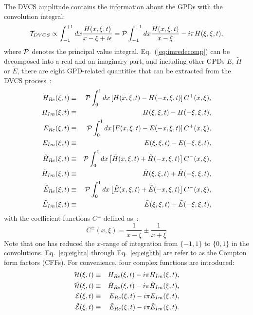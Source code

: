 The DVCS amplitude contains the information about the GPDs with the convolution integral:
\begin{eqnarray}
\mathcal{T}_{DVCS} \propto \int_{-1}^{+1}d x {{H(x,\xi,t)} \over {x - \xi + i \epsilon}}=
{\cal P} \int_{-1}^{+1}d x {H(x,\xi,t) \over {x - \xi}} -i\pi H(\xi,\xi,t) ,
\label{eq:imredecomp}
\end{eqnarray}
where ${\cal P}$ denotes the principal value integral. Eq.~(\ref{eq:imredecomp}) can be decomposed into a real and an imaginary part, and including other GPDs $E$, $\tilde{H}$ or $\tilde{E}$, there are eight GPD-related quantities that can be extracted from the DVCS process~\cite{Gui03}:
\begin{eqnarray}
H_{Re}(\xi , t) &\equiv& {\cal P} \int_0^1 d x \left[ H(x, \xi, t) - H(-x, \xi, t) \right] C^+(x, \xi),\label{eq:eighta} \\
H_{Im}(\xi , t) &\equiv& H(\xi , \xi, t) - H(- \xi, \xi, t),\label{eq:eightb} \\
E_{Re}(\xi , t) &\equiv&   {\cal P}  \int_0^1 d x \left[ E(x, \xi, t) - E(-x, \xi, t) \right] C^+(x, \xi),\label{eq:eightc} \\
E_{Im}(\xi , t) &\equiv& E(\xi , \xi, t) - E(- \xi, \xi, t), \label{eq:eightd} \\
\tilde H_{Re}(\xi , t) &\equiv&  {\cal P}  \int_0^1 d x \left[ \tilde H(x, \xi, t) + \tilde H(-x, \xi, t) \right] C^-(x,\xi),\label{eq:eighte} \\
\tilde H_{Im}(\xi , t) &\equiv& \tilde H(\xi , \xi, t) + \tilde H(- \xi, \xi, t),\label{eq:eightf} \\
\tilde E_{Re}(\xi , t) &\equiv&  {\cal P}  \int_0^1 d x \left[ \tilde E(x, \xi, t) + \tilde E(-x, \xi, t) \right] C^-(x,\xi),\label{eq:eightg} \\
\tilde E_{Im}(\xi , t) &\equiv& \tilde E(\xi , \xi, t) + \tilde E(- \xi, \xi, t), \label{eq:eighth} 
\end{eqnarray}
with the coefficient functions $C^\pm$ defined as~:
\begin{equation}
C^\pm(x, \xi) = \frac{1}{x - \xi} \pm \frac{1}{x + \xi}
\end{equation}
\noindent
Note that one has reduced the $x$-range of integration from $\{-1,1\}$ to $\{0,1\}$ in the convolutions. Eq.~\ref{eq:eighta} through Eq.~\ref{eq:eighth} are refer to as the Compton form factors (CFFs). For convenience, four complex functions are introduced:
\begin{eqnarray}
{\cal H}(\xi,t) &\equiv& H_{Re}(\xi,t) - i \pi H_{Im}(\xi,t),
\label{eq:cffcomplex-1} \\
\tilde{\cal H}(\xi,t) &\equiv& \tilde H_{Re}(\xi,t) - i \pi \tilde H_{Im}(\xi,t),
\label{eq:cffcomplex-2} \\
{\cal E}(\xi,t) &\equiv& E_{Re}(\xi,t) - i \pi E_{Im}(\xi,t),
\label{eq:cffcomplex-3} \\
\tilde{\cal E}(\xi,t) &\equiv& \tilde E_{Re}(\xi,t) - i \pi \tilde E_{Im}(\xi,t).
\label{eq:cffcomplex-4}
\end{eqnarray} 

